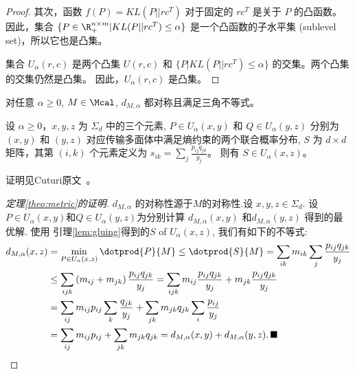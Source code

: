 \documentclass[lang=cn,newtx,10pt,scheme=chinese,chinesefont=nofont,citestyle=gb7714-2015, bibstyle=gb7714-2015]{elegantbook}
\begin{document}
\begin{refsection}
\begin{proof}
其次，函数 $f(P) = KL(P || rc^T)$ 对于固定的 $rc^T$ 是关于 $P$ 的凸函数。
因此，集合 $\{P \in \R_+^{n \times m} | KL(P || rc^T) \le \alpha\}$ 是一个凸函数的子水平集 (sublevel set)，所以它也是凸集。

集合 $U_\alpha(r,c)$ 是两个凸集 $U(r,c)$ 和 $\{P | KL(P || rc^T) \le \alpha\}$ 的交集。两个凸集的交集仍然是凸集。
因此，$U_\alpha(r,c)$ 是凸集。
\end{proof}


\begin{theorem}\label{theo:metric} 对任意 $\alpha\geq 0$, $M\in\Mcal$, $d_{M,\alpha}$ 都对称且满足三角不等式。 %
\end{theorem}
\begin{lemma}[熵约束下的粘合引理]\label{lem:gluing}
设 $\alpha\geq 0$，$x,y,z$ 为 $\Sigma_d$ 中的三个元素, $P\in U_\alpha(x,y)$ 和 $Q\in U_\alpha(y,z)$ 分别为 $(x,y)$ 和 $(y,z)$ 对应传输多面体中满足熵约束的两个联合概率分布, $S$ 为 $d\times d$ 矩阵，其第 $(i,k)$ 个元素定义为 $s_{ik}= \sum_{j} \frac{p_{ij}q_{jk}}{y_j}$。
则有 $S\in U_{\alpha}(x,z)$。
\end{lemma}
证明见Cuturi原文~\cite{cuturi13}。%

\begin{proof}[定理\ref{theo:metric}的证明]
$d_{M,\alpha}$ 的对称性源于$M$的对称性.设 $x,y,z\in\Sigma_d$. 设 $P\in U_{\alpha}(x,y)$和$Q\in U_{\alpha}(y,z)$为分别计算 $d_{M,\alpha}(x,y)$ 和$d_{M,\alpha}(y,z)$ 得到的最优解. 使用   引理\ref{lem:gluing}得到的$S$ of $U_{\alpha}(x,z)$, 我们有如下的不等式:
	$$\begin{aligned}
	d_{M,\alpha}(x,z)&=\min_{P\in U_\alpha(x,z)}\dotprod{P}{M} \leq \dotprod{S}{M} = \sum_{ik} m_{ik}\sum_{j} \frac{p_{ij}q_{jk}}{y_j} \\ & \leq \sum_{ijk} \left(m_{ij}+m_{jk}\right) \frac{p_{ij}q_{jk}}{y_j} = \sum_{ijk} m_{ij} \frac{p_{ij}q_{jk}}{y_j} +m_{jk} \frac{p_{ij}q_{jk}}{y_j}  \\
	& =\sum_{ij} m_{ij}p_{ij} \sum_k \frac{q_{jk}}{y_j} + \sum_{jk} m_{jk} q_{jk} \sum_i \frac{p_{ij}}{y_j}\\
	&= \sum_{ij} m_{ij}p_{ij} + \sum_{jk} m_{jk} q_{jk} = d_{M,\alpha}(x,y)+d_{M,\alpha}(y,z).\,\blacksquare\end{aligned}
	$$
\end{proof}



\end{refsection}
\end{document}
